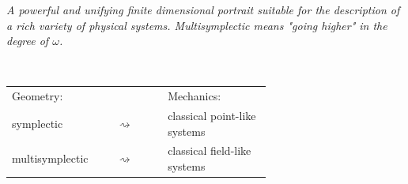 \documentclass[beamer,10pt]{standalone}
\begin{document}
\begin{frame}
		\vspace{-.5em}
		\centering
		\parbox{0.98\linewidth}{%
		\emph{
			A powerful and unifying finite dimensional portrait suitable for the description of a rich variety of physical systems.
		Multisymplectic means \emph{"going higher"} in the degree of $\omega$.
		}
		}
		\\
		\begin{center}\begin{tabular}{p{0.2\linewidth} p{0.15\linewidth} p{0.3\linewidth}}
		Geometry: & & Mechanics: \\
		symplectic &\centering $\rightsquigarrow$ & classical point-like systems \\
		multisymplectic &\centering $\rightsquigarrow$ & classical field-like systems
		\end{tabular}\end{center}

\end{frame}
\end{document}
